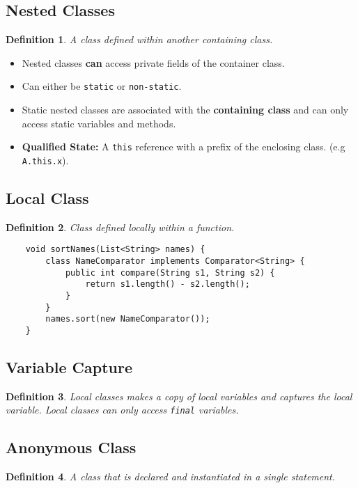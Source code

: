 \documentclass[10pt,landscape,a4paper]{article}
\newtheorem{definition}{Definition}[section]
\begin{document}
\footnotesize
\begin{multicols*}{4}

\section{Nested Classes}
\begin{definition}
    A class defined within another containing class.
\end{definition}
\begin{itemize}
    \item Nested classes \textbf{can} access private fields of the container class.
    \item Can either be \texttt{static} or \texttt{non-static}.
    \item Static nested classes are associated with the \textbf{containing class} and can only access static variables and methods.
    \item \textbf{Qualified State:} A \texttt{this} reference with a prefix of the enclosing class. (e.g \texttt{A.this.x}). 
\end{itemize}

\subsection{Local Class}
\begin{definition}
    Class defined locally within a function.
\end{definition}

\begin{lstlisting}
    void sortNames(List<String> names) {
        class NameComparator implements Comparator<String> {
            public int compare(String s1, String s2) {
                return s1.length() - s2.length();
            }
        }
        names.sort(new NameComparator());
    }
\end{lstlisting}

\subsection{Variable Capture}
\begin{definition}
    Local classes makes a copy of local variables and captures the local variable. Local classes can only access \texttt{final} variables.
\end{definition}

\subsection{Anonymous Class}
\begin{definition}
    A class that is declared and instantiated in a single statement.
\end{definition}


\end{multicols*}
\end{document}

